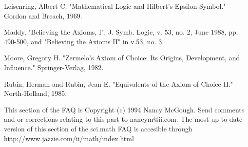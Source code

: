 Leisenring, Albert C.  "Mathematical Logic and Hilbert's Epsilon-Symbol."
Gordon and Breach, 1969.

Maddy, "Believing the Axioms, I", J. Symb. Logic, v. 53, no. 2, June 1988,
pp. 490-500, and "Believing the Axioms II" in v.53, no. 3.

Moore, Gregory H.  "Zermelo's Axiom of Choice: Its Origins, Development, and
Influence."  Springer-Verlag, 1982.

Rubin, Herman and Rubin, Jean E.  "Equivalents of the Axiom of Choice II."
North-Holland, 1985.

This section of the FAQ is Copyright (c) 1994 Nancy McGough.  Send comments
and or corrections relating to this part to nancym@ii.com.  The most up to
date version of this section of the sci.math FAQ is accesible through
http://www.jazzie.com/ii/math/index.html



